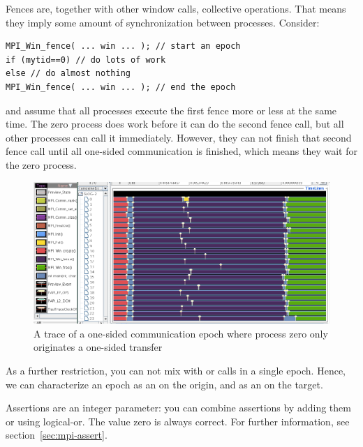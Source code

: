 Fences are, together with other window calls, collective operations. That means they 
imply some amount of synchronization between processes. Consider:
\begin{lstlisting}
MPI_Win_fence( ... win ... ); // start an epoch
if (mytid==0) // do lots of work
else // do almost nothing
MPI_Win_fence( ... win ... ); // end the epoch
\end{lstlisting}
and assume that all processes execute the first fence more or less at the same time.
The zero process does work before it can do the second fence call, but all other
processes can call it immediately. However, they can not finish that second fence call
until all one-sided communication is finished, which means they wait for the zero process.
\begin{figure}[ht]
  \includegraphics[scale=.4]{graphics/lonestar-twonode-put}%
  \caption{A trace of a one-sided communication epoch where process zero only originates
  a one-sided transfer}
  \label{fig:putblock}
\end{figure}

As a further restriction, you can not mix  with 
or  calls in a single epoch. Hence, we can
characterize an epoch as an  on the
origin, and as an  on the target.

Assertions are an integer parameter: you can combine assertions by
adding them or using logical-or.
The value zero is always correct. For further information, see
section~\ref{sec:mpi-assert}.


